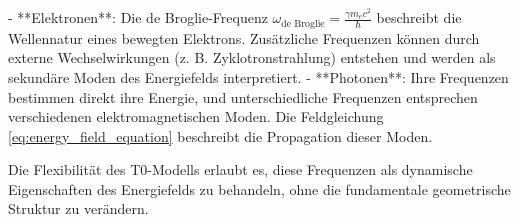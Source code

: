 	- **Elektronen**: Die de Broglie-Frequenz \(\omega_{\text{de Broglie}} = \frac{\gamma m_e c^2}{\hbar}\) beschreibt die Wellennatur eines bewegten Elektrons. Zusätzliche Frequenzen können durch externe Wechselwirkungen (z. B. Zyklotronstrahlung) entstehen und werden als sekundäre Moden des Energiefelds interpretiert.
	- **Photonen**: Ihre Frequenzen bestimmen direkt ihre Energie, und unterschiedliche Frequenzen entsprechen verschiedenen elektromagnetischen Moden. Die Feldgleichung \eqref{eq:energy_field_equation} beschreibt die Propagation dieser Moden.
	
	Die Flexibilität des T0-Modells erlaubt es, diese Frequenzen als dynamische Eigenschaften des Energiefelds zu behandeln, ohne die fundamentale geometrische Struktur zu verändern.
	